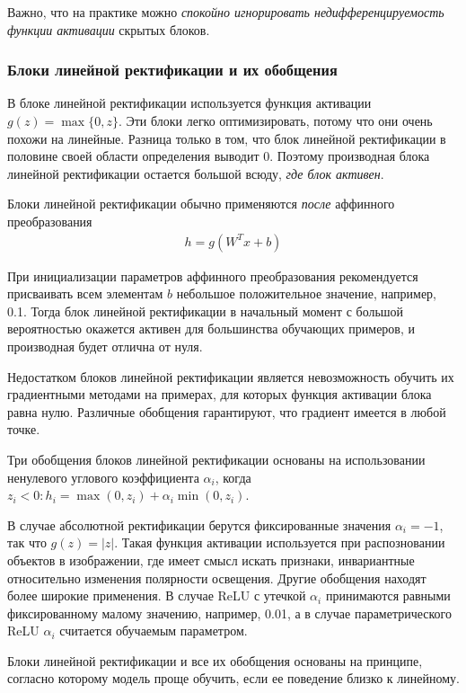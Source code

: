 \documentclass[%
	11pt,
	a4paper,
	utf8,
]{article}
\begin{document}
{\color{blue}Важно, что на практике можно \emph{спокойно игнорировать недифференцируемость функции активации} скрытых блоков.}

\subsubsection{Блоки линейной ректификации и их обобщения}

В блоке линейной ректификации используется функция активации $ g(z) = \max \{ 0, z \} $. Эти блоки легко оптимизировать, потому что они очень похожи на линейные. Разница только в том, что блок линейной ректификации в половине своей области определения выводит 0. {\color{blue}Поэтому производная блока линейной ректификации остается большой всюду, \emph{где блок активен}}.

Блоки линейной ректификации обычно применяются \emph{после} аффинного преобразования
\begin{align*}
	h = g(W^T x + b)
\end{align*}

При инициализации параметров аффинного преобразования рекомендуется присваивать всем элементам $ b $ небольшое положительное значение, например, 0.1. Тогда блок линейной ректификации в начальный момент с большой вероятностью окажется активен для большинства обучающих примеров, и производная будет отлична от нуля.

{\color{red}Недостатком блоков линейной ректификации является невозможность обучить их градиентными методами на примерах, для которых функция активации блока равна нулю}. Различные обобщения гарантируют, что градиент имеется в любой точке.

Три обобщения блоков линейной ректификации основаны на использовании ненулевого углового коэффициента $ \alpha_i $, когда $ z_i < 0: h_i = \max(0, z_i) + \alpha_i \min(0, z_i) $.

В случае абсолютной ректификации берутся фиксированные значения $ \alpha_i = -1 $, так что $ g(z) = | z | $. Такая функция активации используется при распозновании объектов в изображении, где имеет смысл искать признаки, инвариантные относительно изменения полярности освещения. Другие обобщения находят более широкие применения. В случае ReLU с утечкой $ \alpha_i $ принимаются равными фиксированному малому значению, например, 0.01, а в случае параметрического ReLU $ \alpha_i $ считается обучаемым параметром.

Блоки линейной ректификации и все их обобщения основаны на принципе, согласно которому модель проще обучить, если ее поведение близко к линейному.
\end{document}
